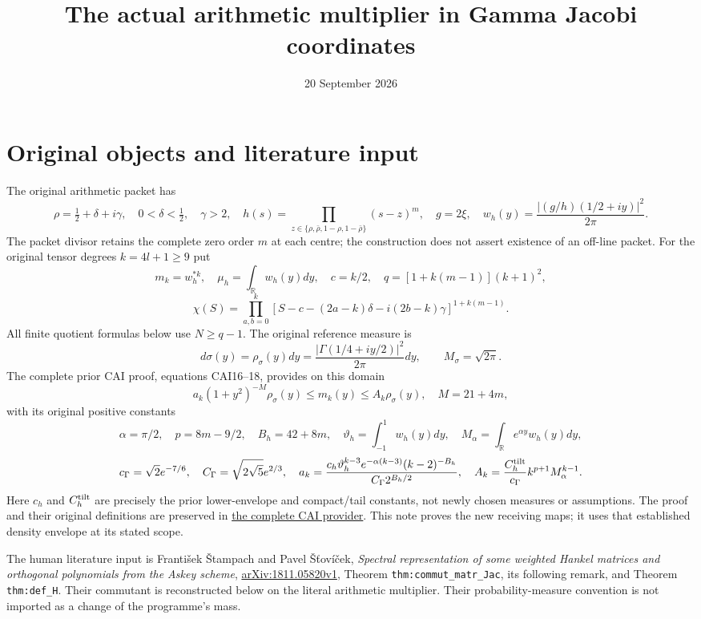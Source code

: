 \documentclass[11pt]{article}
\title{The actual arithmetic multiplier in Gamma Jacobi coordinates}
\author{}
\date{20 September 2026}
\newcommand{\R}{\mathbb R}
\begin{document}
\maketitle

\section{Original objects and literature input}
The original arithmetic packet has
\[
 \rho=\tfrac12+\delta+i\gamma,\quad 0<\delta<\tfrac12,\quad\gamma>2,
 \quad h(s)=\prod_{z\in\{\rho,\bar\rho,1-\rho,1-\bar\rho\}}(s-z)^m,
 \quad g=2\xi,\quad w_h(y)=\frac{|(g/h)(1/2+iy)|^2}{2\pi}.
\]
The packet divisor retains the complete zero order $m$ at each centre;
the construction does not assert existence of an off-line packet.
For the original tensor degrees $k=4l+1\ge9$ put
\[
 m_k=w_h^{*k},\quad\mu_h=\int_\R w_h(y)dy,\quad c=k/2,
 \quad q=[1+k(m-1)](k+1)^2,
\]
\[
 \chi(S)=\prod_{a,b=0}^k
 [S-c-(2a-k)\delta-i(2b-k)\gamma]^{1+k(m-1)}.
\]
All finite quotient formulas below use $N\ge q-1$. The original
reference measure is
\[
 d\sigma(y)=\rho_\sigma(y)dy
 =\frac{|\Gamma(1/4+iy/2)|^2}{2\pi}dy,\qquad
 M_\sigma=\sqrt{2\pi}.
\]
The complete prior CAI proof, equations CAI16--18, provides on this
domain
\begin{equation}\label{eq:envelope}
 a_k(1+y^2)^{-M}\rho_\sigma(y)\le m_k(y)\le A_k\rho_\sigma(y),
 \quad M=21+4m,
\end{equation}
with its original positive constants
\[
 \alpha=\pi/2,\quad p=8m-9/2,\quad B_h=42+8m,\quad
 \vartheta_h=\int_{-1}^1w_h(y)dy,\quad
 M_\alpha=\int_\R e^{\alpha y}w_h(y)dy,
\]
\[
 c_\Gamma=\sqrt2e^{-7/6},\quad C_\Gamma=\sqrt{2\sqrt5}e^{2/3},\quad
 a_k=\frac{c_h\vartheta_h^{k-3}e^{-\alpha(k-3)}(k-2)^{-B_h}}
 {C_\Gamma2^{B_h/2}},\quad
 A_k=\frac{C_h^{\rm tilt}}{c_\Gamma}k^{p+1}M_\alpha^{k-1}.
\]
Here $c_h$ and $C_h^{\rm tilt}$ are precisely the prior lower-envelope
and compact/tail constants, not newly chosen measures or assumptions.
The proof and their original definitions are preserved in
\href{https://github.com/KokunoYumeto/zeta-function-research-reader/blob/2412f4aaa07c3fb19052cc0e537e93c2db9b0b1d/workbenches/splitzero-tandem/continuations/20260920-heat-literature-observed-class/providers/CAI_COMPLETE_PREREQUISITE.tex}
{the complete CAI provider}. This note proves the new receiving maps;
it uses that established density envelope at its stated scope.

The human literature input is Franti\v{s}ek \v{S}tampach and Pavel
\v{S}\v{t}ov\'{i}\v{c}ek,
\emph{Spectral representation of some weighted Hankel matrices and
orthogonal polynomials from the Askey scheme},
\href{https://arxiv.org/abs/1811.05820v1}{arXiv:1811.05820v1},
Theorem \texttt{thm:commut\_matr\_Jac}, its following remark, and
Theorem \texttt{thm:def\_H}. Their commutant is reconstructed below
on the literal arithmetic multiplier. Their probability-measure
convention is not imported as a change of the programme's mass.
\end{document}
